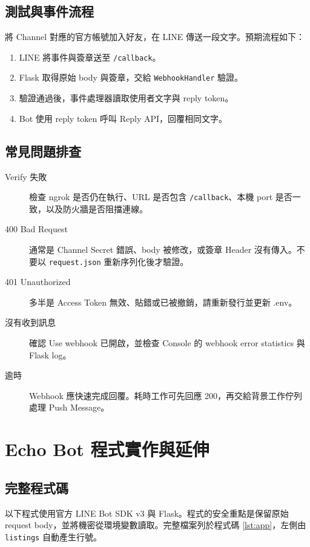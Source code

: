 \documentclass[12pt,a4paper]{report}
\begin{document}
\section{測試與事件流程}
將 Channel 對應的官方帳號加入好友，在 LINE 傳送一段文字。預期流程如下：
\begin{enumerate}
  \item LINE 將事件與簽章送至 \texttt{/callback}。
  \item Flask 取得原始 body 與簽章，交給 \texttt{WebhookHandler} 驗證。
  \item 驗證通過後，事件處理器讀取使用者文字與 reply token。
  \item Bot 使用 reply token 呼叫 Reply API，回覆相同文字。
\end{enumerate}

\section{常見問題排查}
\begin{description}
  \item[Verify 失敗] 檢查 ngrok 是否仍在執行、URL 是否包含 \texttt{/callback}、本機 port 是否一致，以及防火牆是否阻擋連線。
  \item[400 Bad Request] 通常是 Channel Secret 錯誤、body 被修改，或簽章 Header 沒有傳入。不要以 \texttt{request.json} 重新序列化後才驗證。
  \item[401 Unauthorized] 多半是 Access Token 無效、貼錯或已被撤銷，請重新發行並更新 .env。
  \item[沒有收到訊息] 確認 Use webhook 已開啟，並檢查 Console 的 webhook error statistics 與 Flask log。
  \item[逾時] Webhook 應快速完成回覆。耗時工作可先回應 200，再交給背景工作佇列處理 Push Message。
\end{description}

\chapter{Echo Bot 程式實作與延伸}
\section{完整程式碼}
以下程式使用官方 LINE Bot SDK v3 與 Flask。程式的安全重點是保留原始 request body，並將機密從環境變數讀取。完整檔案列於程式碼 \ref{lst:app}，左側由 \texttt{listings} 自動產生行號。


\end{document}
